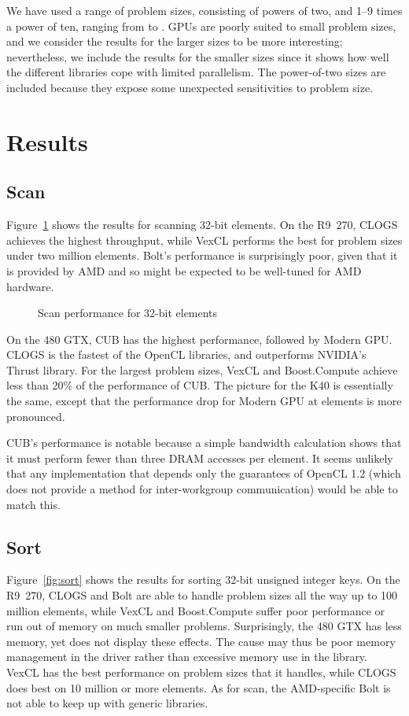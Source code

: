 \documentclass{ws-ppl}
\begin{document}
We have used a range of problem sizes, consisting of powers of two, and 1--9
times a power of ten, ranging from  to . GPUs are poorly suited to
small problem sizes, and we consider the results for the larger sizes to be more
interesting; nevertheless, we include the results for the smaller sizes since
it shows how well the different libraries cope with limited parallelism. The
power-of-two sizes are included because they expose some unexpected
sensitivities to problem size.

\section{Results}
\subsection{Scan}
Figure~\ref{fig:scan} shows the results for scanning 32-bit elements. On the R9~270,
CLOGS achieves the highest throughput, while VexCL performs the best for
problem sizes under two million elements. Bolt's performance is surprisingly
poor, given that it is provided by AMD and so might be expected to be
well-tuned for AMD hardware.

\begin{figure}[hb]
  
  \caption{Scan performance for 32-bit elements}\label{fig:scan}
\end{figure}

On the 480 GTX, CUB has the highest performance, followed by Modern GPU. CLOGS
is the fastest of the OpenCL libraries, and outperforms NVIDIA's Thrust
library. For the largest problem sizes, VexCL and Boost.Compute achieve less
than 20\% of the performance of CUB. The picture for the K40 is essentially
the same, except that the performance drop for Modern GPU at  elements
is more pronounced.

CUB's performance is notable because a simple bandwidth calculation shows that
it must perform fewer than three DRAM accesses per element. It seems unlikely
that any implementation that depends only the guarantees of OpenCL 1.2 (which
does not provide a method for inter-workgroup communication) would be able to
match this.

\subsection{Sort}
Figure~\ref{fig:sort} shows the results for sorting 32-bit unsigned integer
keys. On the R9~270, CLOGS and Bolt are
able to handle problem sizes all the way up to 100 million elements, while
VexCL and Boost.Compute suffer poor performance or run out of memory on much
smaller problems. Surprisingly, the 480 GTX has less
memory, yet does not display these effects. The cause may thus be poor memory
management in the driver rather than excessive memory use in the library.
VexCL has the best performance on problem sizes that it handles, while CLOGS
does best on 10 million or more elements. As for scan, the AMD-specific Bolt
is not able to keep up with generic libraries.
\end{document}

